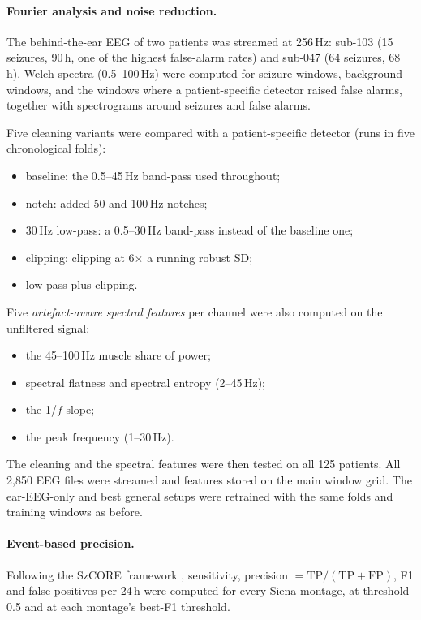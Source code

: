 \paragraph{Fourier analysis and noise reduction.} The behind-the-ear EEG of two patients was streamed at 256\,Hz: sub-103 (15 seizures, 90\,h, one of the highest false-alarm rates) and sub-047 (64 seizures, 68\,h). Welch spectra (0.5--100\,Hz) were computed for seizure windows, background windows, and the windows where a patient-specific detector raised false alarms, together with spectrograms around seizures and false alarms.

Five cleaning variants were compared with a patient-specific detector (runs in five chronological folds):
\begin{itemize}
\item baseline: the 0.5--45\,Hz band-pass used throughout;
\item notch: added 50 and 100\,Hz notches;
\item 30\,Hz low-pass: a 0.5--30\,Hz band-pass instead of the baseline one;
\item clipping: clipping at 6$\times$ a running robust SD;
\item low-pass plus clipping.
\end{itemize}
Five \emph{artefact-aware spectral features} per channel were also computed on the unfiltered signal:
\begin{itemize}
\item the 45--100\,Hz muscle share of power;
\item spectral flatness and spectral entropy (2--45\,Hz);
\item the 1/$f$ slope;
\item the peak frequency (1--30\,Hz).
\end{itemize}
The cleaning and the spectral features were then tested on all 125 patients. All 2,850 EEG files were streamed and features stored on the main window grid. The ear-EEG-only and best general setups were retrained with the same folds and training windows as before.

\paragraph{Event-based precision.} Following the SzCORE framework \cite{dan2024}, sensitivity, precision $=\mathrm{TP}/(\mathrm{TP}+\mathrm{FP})$, F1 and false positives per 24\,h were computed for every Siena montage, at threshold 0.5 and at each montage's best-F1 threshold.

